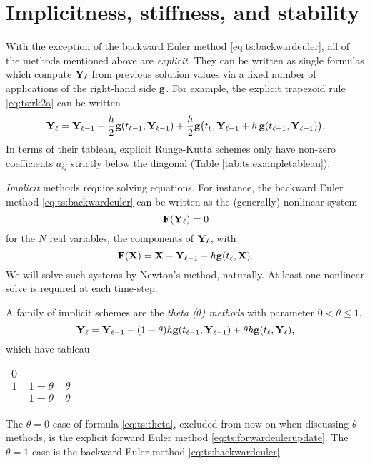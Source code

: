 \section{Implicitness, stiffness, and stability}  With the exception of the backward Euler method \eqref{eq:ts:backwardeuler}, all of the methods mentioned above are \emph{explicit}.  They can be written as single formulas which compute $\mathbf{Y}_\ell$ from previous solution values via a fixed number of applications of the right-hand side $\mathbf{g}$.  For example, the explicit trapezoid rule \eqref{eq:ts:rk2a} can be written
\begin{equation*}
\mathbf{Y}_\ell = \mathbf{Y}_{\ell-1} + \frac{h}{2} \mathbf{g}(t_{\ell-1},\mathbf{Y}_{\ell-1}) + \frac{h}{2} \mathbf{g}\big(t_\ell,\mathbf{Y}_{\ell-1} + h\, \mathbf{g}(t_{\ell-1},\mathbf{Y}_{\ell-1})\big).
\end{equation*}
In terms of their tableau, explicit Runge-Kutta schemes only have non-zero coefficients $a_{ij}$ strictly below the diagonal (Table \ref{tab:ts:exampletableau}).

\emph{Implicit} methods require solving equations.  For instance, the backward Euler method \eqref{eq:ts:backwardeuler} can be written as the (generally) nonlinear system
    $$\mathbf{F}(\mathbf{Y}_\ell)=0$$
for the $N$ real variables, the components of $\mathbf{Y}_\ell$, with
    $$\mathbf{F}(\mathbf{X}) = \mathbf{X} - \mathbf{Y}_{\ell-1} - h \mathbf{g}(t_\ell,\mathbf{X}).$$
We will solve such systems by Newton's method, naturally.  At least one nonlinear solve is required at each time-step.

A family of implicit schemes are the \emph{theta ($\theta$) methods} with parameter $0<\theta\le 1$,
\begin{equation}
\mathbf{Y}_\ell = \mathbf{Y}_{\ell-1} + (1-\theta) h \mathbf{g}(t_{\ell-1},\mathbf{Y}_{\ell-1}) + \theta h \mathbf{g}(t_\ell,\mathbf{Y}_{\ell}),  \label{eq:ts:theta}
\end{equation}
which have tableau
\begin{center}
\begin{tabular}{c|cc}
$0$   \\
$1$ & $1-\theta$ & $\theta$ \\ \hline
    & $1-\theta$ & $\theta$
\end{tabular}
\end{center}
The $\theta=0$ case of formula \eqref{eq:ts:theta}, excluded from now on when discussing $\theta$ methods, is the explicit forward Euler method \eqref{eq:ts:forwardeulerupdate}.  The $\theta=1$ case is the backward Euler method \eqref{eq:ts:backwardeuler}.

